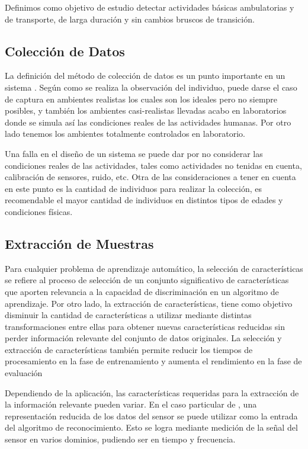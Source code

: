 Definimos como objetivo de estudio detectar actividades básicas ambulatorias
y de transporte, de larga duración y sin cambios bruscos de transición.

\subsection{Colección de Datos}

La definición del método de colección de datos es un punto importante
en un sistema . Según como se realiza la observación del
individuo, puede darse el caso de captura en ambientes realistas los
cuales son los ideales pero no siempre posibles, y también los ambientes
casi-realistas llevadas acabo en laboratorios donde se simula así
las condiciones reales de las actividades humanas. Por otro lado tenemos
los ambientes totalmente controlados en laboratorio.

Una falla en el diseño de un sistema  se puede dar por
no considerar las condiciones reales de las actividades, tales como
actividades no tenidas en cuenta, calibración de sensores, ruido,
etc. Otra de las consideraciones a tener en cuenta en este punto es
la cantidad de individuos para realizar la colección, es recomendable
el mayor cantidad de individuos en distintos tipos de edades y condiciones
físicas.

\subsection{Extracción de Muestras}

Para cualquier problema de aprendizaje automático, la selección de
características se refiere al proceso de selección de un conjunto
significativo de características que aporten relevancia a la capacidad
de discriminación en un algoritmo de aprendizaje. Por otro lado, la
extracción de características, tiene como objetivo disminuir la cantidad
de características a utilizar mediante distintas transformaciones
entre ellas para obtener nuevas características reducidas sin perder
información relevante del conjunto de datos originales. La selección
y extracción de características también permite reducir los tiempos
de procesamiento en la fase de entrenamiento y aumenta el rendimiento
en la fase de evaluación

Dependiendo de la aplicación, las características requeridas para
la extracción de la información relevante pueden variar. En el caso
particular de , una representación reducida de los datos
del sensor se puede utilizar como la entrada del algoritmo de reconocimiento.
Esto se logra mediante medición de la señal del sensor en varios dominios,
pudiendo ser en tiempo y frecuencia.


